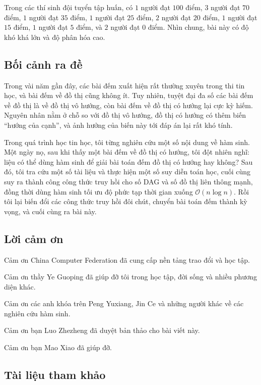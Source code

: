\documentclass[11pt]{article}
\newcommand{\Oh}{\mathcal{O}}
\begin{document}
Trong các thí sinh đội tuyển tập huấn, có \(1\) người đạt \(100\) điểm,
\(3\) người đạt \(70\) điểm, \(1\) người đạt \(35\) điểm, \(1\) người đạt
\(25\) điểm, \(2\) người đạt \(20\) điểm, \(1\) người đạt \(15\) điểm,
\(1\) người đạt \(5\) điểm, và \(2\) người đạt \(0\) điểm. Nhìn chung, bài này
có độ khó khá lớn và độ phân hóa cao.

\subsection{Bối cảnh ra đề}

Trong vài năm gần đây, các bài đếm xuất hiện rất thường xuyên trong thi tin
học, và bài đếm về đồ thị cũng không ít. Tuy nhiên, tuyệt đại đa số các bài
đếm về đồ thị là về đồ thị vô hướng, còn bài đếm về đồ thị có hướng lại cực
kỳ hiếm. Nguyên nhân nằm ở chỗ so với đồ thị vô hướng, đồ thị có hướng có
thêm biến ``hướng của cạnh'', và ảnh hưởng của biến này tới đáp án lại rất khó
tính.

Trong quá trình học tin học, tôi từng nghiên cứu một số nội dung về hàm sinh.
Một ngày nọ, sau khi thấy một bài đếm về đồ thị có hướng, tôi đột nhiên nghĩ:
liệu có thể dùng hàm sinh để giải bài toán đếm đồ thị có hướng hay không? Sau
đó, tôi tra cứu một số tài liệu và thực hiện một số suy diễn toán học, cuối
cùng suy ra thành công công thức truy hồi cho số DAG và số đồ thị liên thông
mạnh, đồng thời dùng hàm sinh tối ưu độ phức tạp thời gian xuống
\(\Oh(n\log n)\). Rồi tôi lại biến đổi các công thức truy hồi đôi chút, chuyển
bài toán đếm thành kỳ vọng, và cuối cùng ra bài này.

\subsection{Lời cảm ơn}

Cảm ơn China Computer Federation đã cung cấp nền tảng trao đổi và học tập.

Cảm ơn thầy Ye Guoping đã giúp đỡ tôi trong học tập, đời sống và nhiều phương
diện khác.

Cảm ơn các anh khóa trên Peng Yuxiang, Jin Ce và những người khác về các
nghiên cứu hàm sinh.

Cảm ơn bạn Luo Zhezheng đã duyệt bản thảo cho bài viết này.

Cảm ơn bạn Mao Xiao đã giúp đỡ.

\subsection*{Tài liệu tham khảo}
\end{document}
